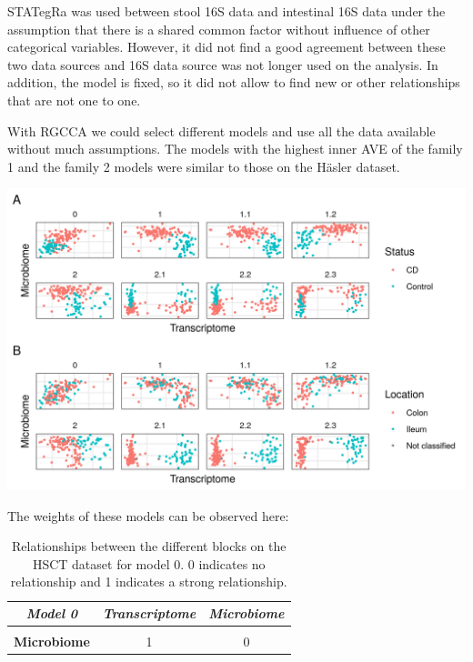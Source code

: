 \documentclass[
  12pt,
  a4paper,
  twoside,
  openright]{book}
\let\origfigure\figure
\let\endorigfigure\endfigure
\renewenvironment{figure}[1][2] {
    \expandafter\origfigure\expandafter[!htp]
} {
    \endorigfigure
}
\begin{document}
STATegRa was used between stool 16S data and intestinal 16S data under the assumption that there is a shared common factor without influence of other categorical variables.
However, it did not find a good agreement between these two data sources and 16S data source was not longer used on the analysis.
In addition, the model is fixed, so it did not allow to find new or other relationships that are not one to one.

With RGCCA we could select different models and use all the data available without much assumptions.
The models with the highest inner AVE of the family 1 and the family 2 models were similar to those on the Häsler dataset.

\begin{figure}
\includegraphics[width=1\linewidth]{images/hsct-models} \caption[Models on the HSCT dataset.]{On the abscissa the transcriptome, on the ordinate the Microbiome. Each square represents a different model of the HSCT dataset. On panel A colored by disease status, on panel B colored by sample location. Model 0 has only transcriptome and microbiome data, models 1 to 1.2 with data about the samples and models 2.1 to 2.3 with data about the samples split in 3 blocks.}\label{fig:hsct-models}
\end{figure}

The weights of these models can be observed here:

\begin{table}[H]

\caption[Model 0 of the HSCT dataset.]{\label{tab:hsct-model0}Relationships between the different blocks on the HSCT dataset for model 0. 0 indicates no relationship and 1 indicates a strong relationship.}
\centering
\begin{tabular}[t]{|>{}c|c|>{}c|}
\hline
\em{\textbf{Model 0}} & \em{\textbf{Transcriptome}} & \em{\textbf{Microbiome}}\\
\hline
\textbf{\cellcolor{gray!6}{Transcriptome}} & \cellcolor{gray!6}{0} & \cellcolor{gray!6}{1}\\
\hline
\textbf{Microbiome} & 1 & 0\\
\hline
\end{tabular}
\end{table}
\end{document}
